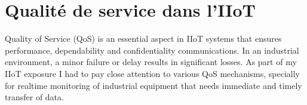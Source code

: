 \section{Qualité de service dans l'IIoT}
Quality of Service (QoS) is an essential aspect in IIoT systems that ensures performance, dependability and confidentiality communications. In an industrial environment, a minor failure or delay results in significant losses. As part of my IIoT exposure I had to pay close attention to various QoS mechanisms, specially for realtime monitoring of industrial equipment that needs immediate and timely transfer of data.